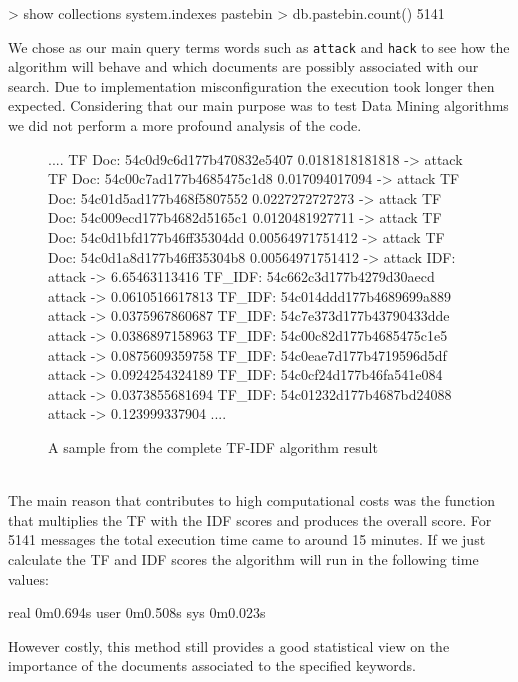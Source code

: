\documentclass[12pt]{article}
\begin{document}
\begin{spverbatim}
> show collections
system.indexes
pastebin
> db.pastebin.count()
5141
\end{spverbatim}
\hfill \break 
We chose as our main query terms words such as \texttt{attack} and \texttt{hack} to see how the algorithm will behave and which documents are possibly associated with our search. Due to implementation misconfiguration the execution took longer then expected. Considering that our main purpose was to test Data Mining algorithms we did not perform a more profound analysis of the code.

\begin{figure}[h!] 
\begin{footnotesize} 
\begin{spverbatim}
....
TF Doc: 54c0d9c6d177b470832e5407 0.0181818181818 -> attack
TF Doc: 54c00c7ad177b4685475c1d8 0.017094017094 -> attack
TF Doc: 54c01d5ad177b468f5807552 0.0227272727273 -> attack
TF Doc: 54c009ecd177b4682d5165c1 0.0120481927711 -> attack
TF Doc: 54c0d1bfd177b46ff35304dd 0.00564971751412 -> attack
TF Doc: 54c0d1a8d177b46ff35304b8 0.00564971751412 -> attack
IDF:  attack -> 6.65463113416
TF_IDF:  54c662c3d177b4279d30aecd attack -> 0.0610516617813
TF_IDF:  54c014ddd177b4689699a889 attack -> 0.0375967860687
TF_IDF:  54c7e373d177b43790433dde attack -> 0.0386897158963
TF_IDF:  54c00c82d177b4685475c1e5 attack -> 0.0875609359758
TF_IDF:  54c0eae7d177b4719596d5df attack -> 0.0924254324189
TF_IDF:  54c0cf24d177b46fa541e084 attack -> 0.0373855681694
TF_IDF:  54c01232d177b4687bd24088 attack -> 0.123999337904
....
\end{spverbatim}
\captionsetup{font=small}
\caption{A sample from the complete TF-IDF algorithm result}
\end{footnotesize}
\end{figure}
\hfill \break \\
The main reason that contributes to high computational costs was the function that multiplies the TF with the IDF scores and produces the overall score. For 5141 messages the total execution time came to around 15 minutes. If we just calculate the TF and IDF scores the algorithm will run in the following time values: 
\begin{spverbatim}
real	0m0.694s	
user	0m0.508s		
sys	0m0.023s
\end{spverbatim}
\hfill \break
However costly, this method still provides a good statistical view on the importance of the documents associated to the specified keywords. 
\hfill \break \\\\
\end{document}
